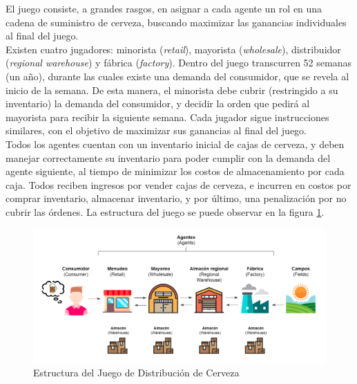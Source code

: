 El juego consiste, a grandes rasgos, en asignar a cada agente un rol en una cadena de suministro de cerveza, buscando maximizar las ganancias individuales al final del juego.\\

Existen cuatro jugadores: minorista (\textit{retail}), mayorista (\textit{wholesale}), distribuidor (\textit{regional warehouse}) y f\'abrica (\textit{factory}). Dentro del juego transcurren 52 semanas (un a\~no), durante las cuales existe una demanda del consumidor, que se revela al inicio de la semana. De esta manera, el minorista debe cubrir (restringido a su inventario) la demanda del consumidor, y decidir la orden que pedir\'a al mayorista para recibir la siguiente semana. Cada jugador sigue instrucciones similares, con el objetivo de maximizar sus ganancias al final del juego.\\

Todos los agentes cuentan con un inventario inicial de cajas de cerveza, y deben manejar correctamente su inventario para poder cumplir con la demanda del agente siguiente, al tiempo de minimizar los costos de almacenamiento por cada caja. Todos reciben ingresos por vender cajas de cerveza, e incurren en costos por comprar inventario, almacenar inventario, y por \'ultimo, una penalizaci\'on por no cubrir las \'ordenes. La estructura del juego se puede observar en la figura \ref{structure}.\\


\begin{figure}[ht]
\label{structure}
\includegraphics[width=15cm]{tesis_tex/figs/beer_distribution_game_structure.PNG}
\caption[Estructura del Juego de Distribución de Cerveza]{Estructura del Juego de Distribución de Cerveza\protect\footnotemark}
\centering
\end{figure}


